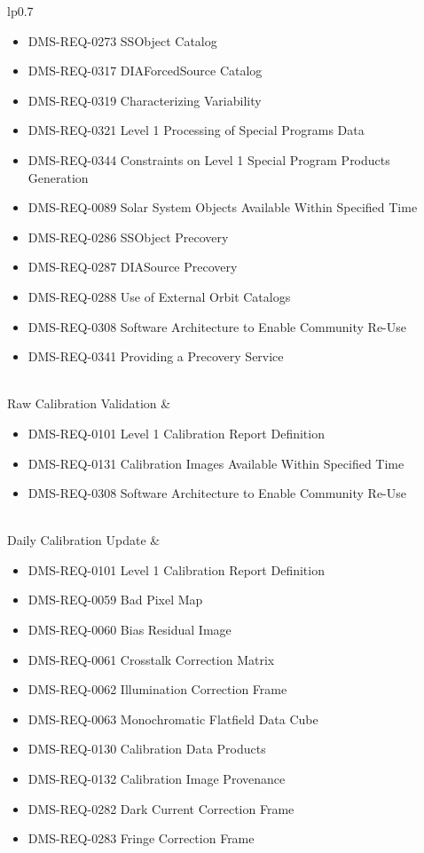 \begin{xtabular}{lp{0.7\textwidth}}
\begin{itemize}
\item DMS-REQ-0273 SSObject Catalog
\item DMS-REQ-0317 DIAForcedSource Catalog
\item DMS-REQ-0319 Characterizing Variability
\item DMS-REQ-0321 Level 1 Processing of Special Programs Data
\item DMS-REQ-0344 Constraints on Level 1 Special Program Products Generation
\item DMS-REQ-0089 Solar System Objects Available Within Specified Time
\item DMS-REQ-0286 SSObject Precovery
\item DMS-REQ-0287 DIASource Precovery
\item DMS-REQ-0288 Use of External Orbit Catalogs
\item DMS-REQ-0308 Software Architecture to Enable Community Re-Use
\item DMS-REQ-0341 Providing a Precovery Service
\end{itemize} \\ \hline
Raw Calibration Validation &
\begin{itemize}DMS-REQ-0265 Guider Calibration Data Acquisition
\item DMS-REQ-0101 Level 1 Calibration Report Definition
\item DMS-REQ-0131 Calibration Images Available Within Specified Time
\item DMS-REQ-0308 Software Architecture to Enable Community Re-Use
\end{itemize} \\ \hline
Daily Calibration Update &
\begin{itemize}DMS-REQ-0265 Guider Calibration Data Acquisition
\item DMS-REQ-0101 Level 1 Calibration Report Definition
\item DMS-REQ-0059 Bad Pixel Map
\item DMS-REQ-0060 Bias Residual Image
\item DMS-REQ-0061 Crosstalk Correction Matrix
\item DMS-REQ-0062 Illumination Correction Frame
\item DMS-REQ-0063 Monochromatic Flatfield Data Cube
\item DMS-REQ-0130 Calibration Data Products
\item DMS-REQ-0132 Calibration Image Provenance
\item DMS-REQ-0282 Dark Current Correction Frame
\item DMS-REQ-0283 Fringe Correction Frame

\end{itemize}
\end{xtabular}
